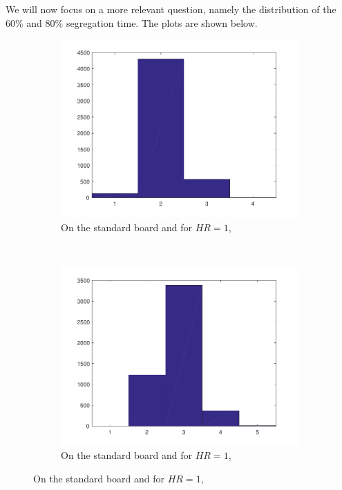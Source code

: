 We will now focus on a more relevant question, namely the distribution of the $60\%$ and $80\%$ segregation time. The plots are shown below.
\begin{figure}[H]
\begin{subfigure}{0.45\textwidth}
    \centering
    \includegraphics[width=\textwidth]{./60_80_segregation_aantgen/60_segregation.pdf}
    \caption{On the standard board and for $HR=1$, }
    \label{fig:segaantgen60}
\end{subfigure}
~
\begin{subfigure}{0.45\textwidth}
    \centering
    \includegraphics[width=\textwidth]{./60_80_segregation_aantgen/80_segregation.pdf}
    \caption{On the standard board and for $HR=1$, }
    \label{fig:segaantgen80}
\end{subfigure}
\end{figure}
